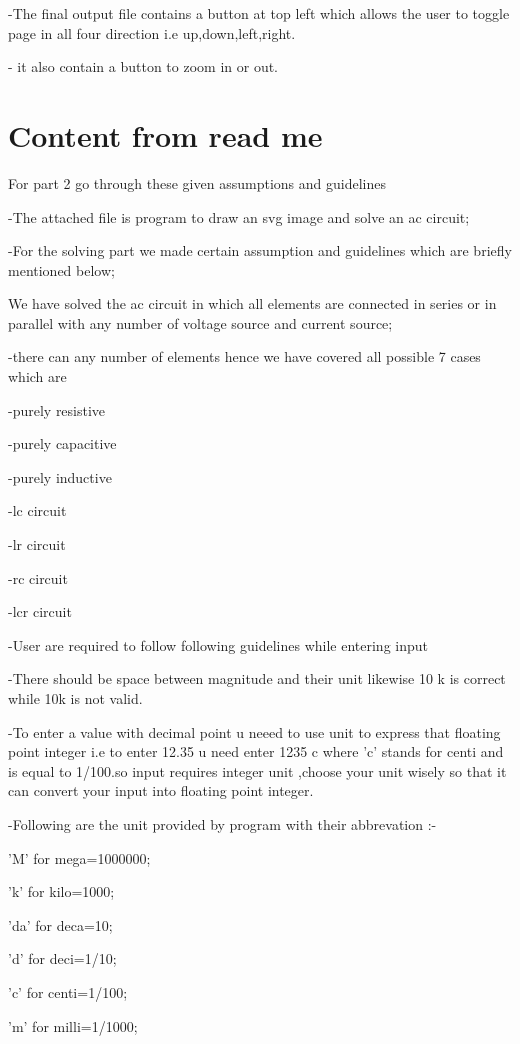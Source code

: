 \documentclass[]{article}
\begin{document}
-The final output file contains a button at top left which allows the user to toggle page in all four direction i.e up,down,left,right.

- it also contain a button to zoom in or out.


\section{Content from read me}

For part 2 go through these given assumptions and guidelines

-The attached file is program to draw an svg image and solve an ac circuit;

-For the solving part we made certain assumption and guidelines which 
are briefly mentioned below;

We have solved the ac circuit in which all elements are connected in series or in parallel with any number of voltage source and  current source;

-there can any number of elements hence we have covered all possible 7 cases which are 

-purely resistive

-purely capacitive

-purely inductive

-lc circuit

-lr circuit

-rc circuit

-lcr circuit

-User are required to follow following guidelines while entering input

-There should be space between magnitude and their unit likewise 10 k is correct while 10k is not valid.

-To enter a value with decimal point u neeed to use unit to express that floating point integer i.e to enter 12.35 u need enter 1235 c where 'c'
stands for centi and is equal to 1/100.so input requires integer unit ,choose your unit wisely so that it can convert your input into floating point integer.

-Following are the unit provided by program with their abbrevation :-

'M'  for mega=1000000;

'k'  for kilo=1000;

'da'  for deca=10;

'd'  for deci=1/10;

'c'  for centi=1/100;

'm'  for milli=1/1000;
\end{document}
